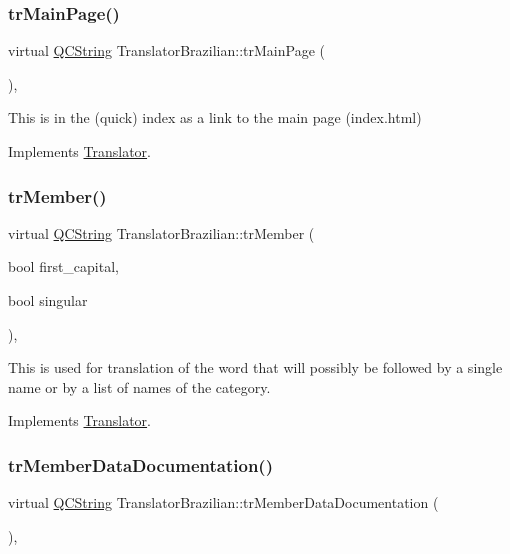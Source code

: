 \subsubsection{\texorpdfstring{trMainPage()}{trMainPage()}}
{\footnotesize\ttfamily virtual \mbox{\hyperlink{class_q_c_string}{Q\+C\+String}} Translator\+Brazilian\+::tr\+Main\+Page (\begin{DoxyParamCaption}{ }\end{DoxyParamCaption})\hspace{0.3cm}{\ttfamily [inline]}, {\ttfamily [virtual]}}

This is in the (quick) index as a link to the main page (index.\+html) 

Implements \mbox{\hyperlink{class_translator}{Translator}}.

\mbox{\label{class_translator_brazilian_ae861972de2d25e3de54e214b7d7ad0a8}} 
\subsubsection{\texorpdfstring{trMember()}{trMember()}}
{\footnotesize\ttfamily virtual \mbox{\hyperlink{class_q_c_string}{Q\+C\+String}} Translator\+Brazilian\+::tr\+Member (\begin{DoxyParamCaption}\item[{bool}]{first\+\_\+capital,  }\item[{bool}]{singular }\end{DoxyParamCaption})\hspace{0.3cm}{\ttfamily [inline]}, {\ttfamily [virtual]}}

This is used for translation of the word that will possibly be followed by a single name or by a list of names of the category. 

Implements \mbox{\hyperlink{class_translator}{Translator}}.

\mbox{\label{class_translator_brazilian_a3a3934dce80da1fbdb387e1c80c55439}} 
\subsubsection{\texorpdfstring{trMemberDataDocumentation()}{trMemberDataDocumentation()}}
{\footnotesize\ttfamily virtual \mbox{\hyperlink{class_q_c_string}{Q\+C\+String}} Translator\+Brazilian\+::tr\+Member\+Data\+Documentation (\begin{DoxyParamCaption}{ }\end{DoxyParamCaption})\hspace{0.3cm}{\ttfamily [inline]}, {\ttfamily [virtual]}}

